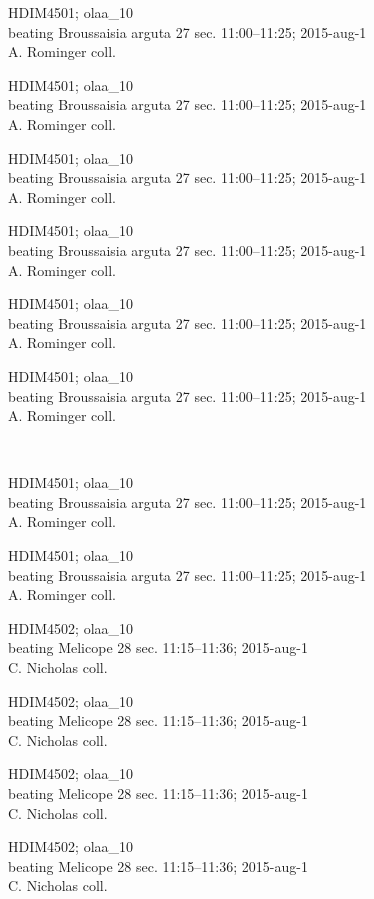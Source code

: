 \documentclass[2pt]{extarticle}
\begin{document}
\noindent
\parbox{0.16\textwidth}{\tiny \raggedright \rule[-0.3\baselineskip]{0pt}{10pt}HDIM4501; olaa\_10\\ beating Broussaisia arguta 27 sec. 11:00--11:25; 2015-aug-1\\ A. Rominger coll.}
\parbox{0.16\textwidth}{\tiny \raggedright \rule[-0.3\baselineskip]{0pt}{10pt}HDIM4501; olaa\_10\\ beating Broussaisia arguta 27 sec. 11:00--11:25; 2015-aug-1\\ A. Rominger coll.}
\parbox{0.16\textwidth}{\tiny \raggedright \rule[-0.3\baselineskip]{0pt}{10pt}HDIM4501; olaa\_10\\ beating Broussaisia arguta 27 sec. 11:00--11:25; 2015-aug-1\\ A. Rominger coll.}
\parbox{0.16\textwidth}{\tiny \raggedright \rule[-0.3\baselineskip]{0pt}{10pt}HDIM4501; olaa\_10\\ beating Broussaisia arguta 27 sec. 11:00--11:25; 2015-aug-1\\ A. Rominger coll.}
\parbox{0.16\textwidth}{\tiny \raggedright \rule[-0.3\baselineskip]{0pt}{10pt}HDIM4501; olaa\_10\\ beating Broussaisia arguta 27 sec. 11:00--11:25; 2015-aug-1\\ A. Rominger coll.}
\parbox{0.16\textwidth}{\tiny \raggedright \rule[-0.3\baselineskip]{0pt}{10pt}HDIM4501; olaa\_10\\ beating Broussaisia arguta 27 sec. 11:00--11:25; 2015-aug-1\\ A. Rominger coll.} \\ 
\vspace{0.001in} 

\noindent
\parbox{0.16\textwidth}{\tiny \raggedright \rule[-0.3\baselineskip]{0pt}{10pt}HDIM4501; olaa\_10\\ beating Broussaisia arguta 27 sec. 11:00--11:25; 2015-aug-1\\ A. Rominger coll.}
\parbox{0.16\textwidth}{\tiny \raggedright \rule[-0.3\baselineskip]{0pt}{10pt}HDIM4501; olaa\_10\\ beating Broussaisia arguta 27 sec. 11:00--11:25; 2015-aug-1\\ A. Rominger coll.}
\parbox{0.16\textwidth}{\tiny \raggedright \rule[-0.3\baselineskip]{0pt}{10pt}HDIM4502; olaa\_10\\ beating Melicope 28 sec. 11:15--11:36; 2015-aug-1\\ C. Nicholas coll.}
\parbox{0.16\textwidth}{\tiny \raggedright \rule[-0.3\baselineskip]{0pt}{10pt}HDIM4502; olaa\_10\\ beating Melicope 28 sec. 11:15--11:36; 2015-aug-1\\ C. Nicholas coll.}
\parbox{0.16\textwidth}{\tiny \raggedright \rule[-0.3\baselineskip]{0pt}{10pt}HDIM4502; olaa\_10\\ beating Melicope 28 sec. 11:15--11:36; 2015-aug-1\\ C. Nicholas coll.}
\parbox{0.16\textwidth}{\tiny \raggedright \rule[-0.3\baselineskip]{0pt}{10pt}HDIM4502; olaa\_10\\ beating Melicope 28 sec. 11:15--11:36; 2015-aug-1\\ C. Nicholas coll.} \\ 
\vspace{0.001in} 
\end{document}
